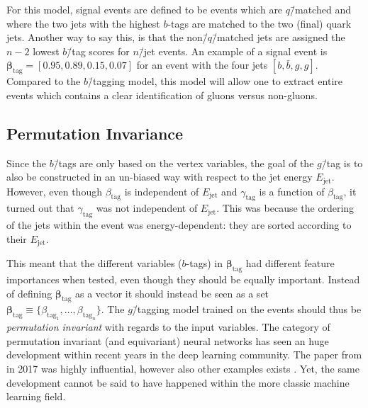 For this model, signal events are defined to be events which are $q$\=/matched and where the two jets with the highest $b$-tags are matched to the two (final) quark jets. Another way to say this, is that the non\=/$q$\=/matched jets are assigned the $n-2$ lowest $b$\=/tag scores for $n$\=/jet events. An example of a signal event is $\bm{\beta}_\mathrm{tag}=[0.95, 0.89, 0.15, 0.07]$ for an event with the four jets $[b, \bar{b}, g, g]$. Compared to the $b$\=/tagging model, this model will allow one to extract entire events which contains a clear identification of gluons versus non-gluons.

\subsection{Permutation Invariance}
\label{subsec:q:permutation_invariance}

Since the $b$\=/tags are only based on the vertex variables, the goal of the $g$\=/tag is to also be constructed in an un-biased way with respect to the jet energy $E_\mathrm{jet}$. However, even though $\beta_\mathrm{tag}$ is independent of $E_\mathrm{jet}$ and $\gamma_\mathrm{tag}$ is a function of $\beta_\mathrm{tag}$, it turned out that $\gamma_\mathrm{tag}$ was not independent of $ E_\mathrm{jet}$. This was because the ordering of the jets within the event was energy-dependent: they are sorted according to their $E_\mathrm{jet}$. 

This meant that the different variables ($b$-tags) in $\bm{\beta}_\mathrm{tag}$ had different feature importances when tested, even though they should be equally important. Instead of defining $\bm{\beta}_\mathrm{tag}$ as a vector it should instead be seen as a set $\bm{\beta}_\mathrm{tag} \equiv \{\beta_{\mathrm{tag}_1}, \dots, \beta_{\mathrm{tag}_n}\}$. The $g$\=/tagging model trained on the events should thus be \emph{permutation invariant} with regards to the input variables. The category of permutation invariant (and equivariant) neural networks has seen an huge development within recent years in the deep learning community. The paper from \citet{zaheerDeepSets2017} in \num{2017} was highly influential, however also other examples exists \autocite{ravanbakhshDeepLearningSets2017, guttenbergPermutationequivariantNeuralNetworks2016}. Yet, the same development cannot be said to have happened within the more classic machine learning field.


